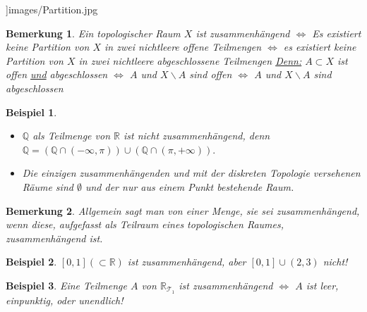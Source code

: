 \documentclass[a4paper,11pt,notitlepage]{report}
\newtheorem{remark}{Bemerkung}[chapter]
\newtheorem{example}{Beispiel}[chapter]
\newcommand{\R}{{\ensuremath{\mathbb{R}}}}
\newcommand{\Q}{{\ensuremath{\mathbb{Q}}}}
\begin{document}
]{images/Partition.jpg}

\begin{remark}
	Ein topologischer Raum $X$ ist zusammenhängend 
	$\Leftrightarrow$ Es existiert keine Partition von $X$ in zwei nichtleere offene Teilmengen
	$\Leftrightarrow$ es existiert keine Partition von $X$ in zwei nichtleere abgeschlossene Teilmengen
	\newline
	\underline{Denn:} $A \subset X$ ist offen \underline{und} abgeschlossen
	$\Leftrightarrow$ $A$ und $X \backslash A$ sind offen
	$\Leftrightarrow$ $A$ und $X \backslash A$ sind abgeschlossen
\end{remark}

\begin{example}
	\begin{itemize}
		\item $\Q$ als Teilmenge von $\R$ ist nicht zusammenhängend, denn $\Q = (\Q \cap (- \infty, \pi)) \cup (\Q \cap (\pi, +\infty)).$
		\item Die einzigen zusammenhängenden und mit der diskreten Topologie versehenen Räume sind $\emptyset$ und der nur aus einem Punkt bestehende Raum.
	\end{itemize}
\end{example}

\begin{remark}
	Allgemein sagt man von einer Menge, sie sei zusammenhängend, wenn diese, aufgefasst als Teilraum eines topologischen Raumes, zusammenhängend ist.
\end{remark}

\begin{example}
	$[0,1] (\subset \R)$ ist zusammenhängend, aber $[0,1] \cup (2,3)$ nicht!
\end{example}

\begin{example}
	Eine Teilmenge $A$ von $\R_{\mathcal{T}_1}$ ist zusammenhängend
	$\Leftrightarrow$ $A$ ist leer, einpunktig, oder unendlich!
\end{example}
\end{document}
